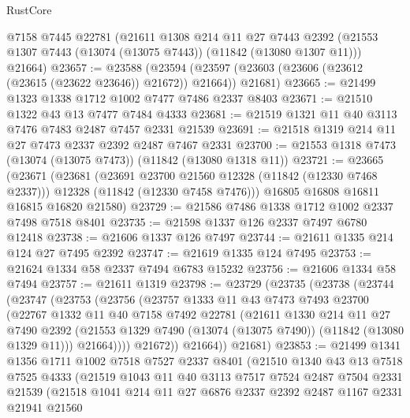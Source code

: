 \begin{lexlean}{RustCore}
\begin{coremodule}
    @7158
    @7445
    @22781
    (@21611
      @1308
      @214
      @11
      @27
      @7443
      @2392
      (@21553 @1307 @7443 (@13074 (@13075 @7443)) (@11842 (@13080 @1307 @11)))
      @21664)
@23657 := @23588
    (@23594 (@23597 (@23603 (@23606 (@23612 (@23615 (@23622 @23646)) @21672)) @21664)) @21681)
@23665 := @21499 @1323 @1338 @1712 @1002 @7477 @7486 @2337 @8403
@23671 := @21510 @1322 @43 @13 @7477 @7484 @4333
@23681 := @21519 @1321 @11 @40 @3113 @7476 @7483 @2487 @7457 @2331 @21539
@23691 := @21518 @1319 @214 @11 @27 @7473 @2337 @2392 @2487 @7467 @2331
@23700 := @21553 @1318 @7473 (@13074 (@13075 @7473)) (@11842 (@13080 @1318 @11))
@23721 := @23665
    (@23671
      (@23681
        (@23691 @23700 @21560 @12328 (@11842 (@12330 @7468 @2337)))
        @12328
        (@11842 (@12330 @7458 @7476)))
      @16805
      @16808
      @16811
      @16815
      @16820
      @21580)
@23729 := @21586 @7486 @1338 @1712 @1002 @2337 @7498 @7518 @8401
@23735 := @21598 @1337 @126 @2337 @7497 @6780 @12418
@23738 := @21606 @1337 @126 @7497
@23744 := @21611 @1335 @214 @124 @27 @7495 @2392
@23747 := @21619 @1335 @124 @7495
@23753 := @21624 @1334 @58 @2337 @7494 @6783 @15232
@23756 := @21606 @1334 @58 @7494
@23757 := @21611 @1319
@23798 := @23729
    (@23735
      (@23738
        (@23744
          (@23747
            (@23753
              (@23756
                (@23757
                  @1333
                  @11
                  @43
                  @7473
                  @7493
                  @23700
                  (@22767
                    @1332
                    @11
                    @40
                    @7158
                    @7492
                    @22781
                    (@21611
                      @1330
                      @214
                      @11
                      @27
                      @7490
                      @2392
                      (@21553 @1329 @7490 (@13074 (@13075 @7490)) (@11842 (@13080 @1329 @11)))
                      @21664))))
              @21672))
          @21664))
      @21681)
@23853 := @21499
    @1341
    @1356
    @1711
    @1002
    @7518
    @7527
    @2337
    @8401
    (@21510
      @1340
      @43
      @13
      @7518
      @7525
      @4333
      (@21519
        @1043
        @11
        @40
        @3113
        @7517
        @7524
        @2487
        @7504
        @2331
        @21539
        (@21518
          @1041
          @214
          @11
          @27
          @6876
          @2337
          @2392
          @2487
          @1167
          @2331
          @21941
          @21560

\end{coremodule}
\end{lexlean}
